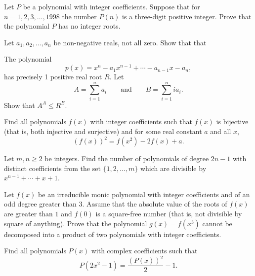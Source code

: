 \documentclass[12pt,a4paper]{memoir}
\theoremstyle{definition}
\begin{document}
\begin{question}[name={1998 Baltic Way}]
	Let $P$ be a polynomial with integer coefficients. Suppose that for $n=1,2,3,\ldots ,1998$ the number $P(n)$ is a three-digit positive integer. Prove that the polynomial $P$ has no integer roots.	
\end{question}


\begin{question}[name={1996 IMO Shortlist}]
	Let $a_{1}, a_{2},\dots, a_{n}$ be non-negative reals, not all zero. Show that that
	\begin{tasks}
		\task The polynomial \[p(x) = x^{n} - a_{1}x^{n - 1} + \cdots - a_{n - 1}x - a_{n},\] has precisely 1 positive real root $R$.
		\task Let \[A = \sum_{i = 1}^n a_{i} \qquad \text{and} \qquad B = \sum_{i = 1}^n ia_{i}.\] Show that $A^{A} \leq R^{B}$.
	\end{tasks}
\end{question}


\begin{question}[name={1997 Romania}]
	Find all polynomials $f(x)$ with integer coefficients such that $f(x)$ is bijective (that is, both injective and surjective) and for some real constant $a$ and all $x$, \[(f(x))^2 = f(x^2)-2f(x)+a.\]
\end{question}

\begin{question}[name={1995 Romania}]
	Let $m,n\geq 2$ be integers. Find the number of polynomials of degree $2n-1$ with distinct coefficients from the set $\{1,2,\dots,m\}$ which are divisible by $x^{n-1}+\cdots+x+1$.
\end{question}

\begin{question}[name={1995 Romania}]
	Let $f(x)$ be an irreducible monic polynomial with integer coefficients and of an odd degree greater than $3$. Assume that the absolute value of the roots of $f(x)$ are greater than $1$ and $f(0)$ is a square-free number (that is, not divisible by square of anything). Prove that the polynomial $g(x)=f(x^3)$ cannot be decomposed into a product of two polynomials with integer coefficients.
\end{question}

\begin{question}[name={1998 Iran}]
	Find all polynomials $P(x)$ with complex coefficients such that
	\[P(2x^2-1) = \frac{(P(x))^2}{2}-1.\]
\end{question}
\end{document}
